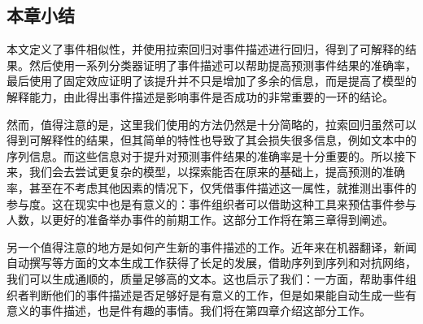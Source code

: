 \documentclass[12pt]{template}
\begin{document}
\subsection{本章小结}
本文定义了事件相似性，并使用拉索回归对事件描述进行回归，得到了可解释的结果。然后使用一系列分类器证明了事件描述可以帮助提高预测事件结果的准确率，最后使用了固定效应证明了该提升并不只是增加了多余的信息，而是提高了模型的解释能力，由此得出事件描述是影响事件是否成功的非常重要的一环的结论。

然而，值得注意的是，这里我们使用的方法仍然是十分简略的，拉索回归虽然可以得到可解释性的结果，但其简单的特性也导致了其会损失很多信息，例如文本中的序列信息。而这些信息对于提升对预测事件结果的准确率是十分重要的。所以接下来，我们会去尝试更复杂的模型，以探索能否在原来的基础上，提高预测的准确率，甚至在不考虑其他因素的情况下，仅凭借事件描述这一属性，就推测出事件的参与度。这在现实中也是有意义的：事件组织者可以借助这种工具来预估事件参与人数，以更好的准备举办事件的前期工作。这部分工作将在第三章得到阐述。

另一个值得注意的地方是如何产生新的事件描述的工作。近年来在机器翻译，新闻自动撰写等方面的文本生成工作获得了长足的发展，借助序列到序列和对抗网络，我们可以生成通顺的，质量足够高的文本。这也启示了我们：一方面，帮助事件组织者判断他们的事件描述是否足够好是有意义的工作，但是如果能自动生成一些有意义的事件描述，也是件有趣的事情。我们将在第四章介绍这部分工作。
\end{document}
